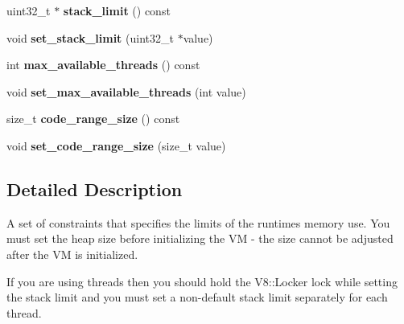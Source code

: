\begin{DoxyCompactItemize}
\item 
\hypertarget{classv8_1_1_resource_constraints_aafc4a94f2eeb0684e7a50f355eb4d06d}{}uint32\+\_\+t $\ast$ {\bfseries stack\+\_\+limit} () const \label{classv8_1_1_resource_constraints_aafc4a94f2eeb0684e7a50f355eb4d06d}

\item 
\hypertarget{classv8_1_1_resource_constraints_a26ed3e89985a4afe34e84509fb093cf1}{}void {\bfseries set\+\_\+stack\+\_\+limit} (uint32\+\_\+t $\ast$value)\label{classv8_1_1_resource_constraints_a26ed3e89985a4afe34e84509fb093cf1}

\item 
\hypertarget{classv8_1_1_resource_constraints_a27a36f0bacb800468d3574f738d12436}{}int {\bfseries max\+\_\+available\+\_\+threads} () const \label{classv8_1_1_resource_constraints_a27a36f0bacb800468d3574f738d12436}

\item 
\hypertarget{classv8_1_1_resource_constraints_a1bec2735c94ff50bfbd54bd70f004b72}{}void {\bfseries set\+\_\+max\+\_\+available\+\_\+threads} (int value)\label{classv8_1_1_resource_constraints_a1bec2735c94ff50bfbd54bd70f004b72}

\item 
\hypertarget{classv8_1_1_resource_constraints_a8dd511917ad17bf2185d574b0c7e4186}{}size\+\_\+t {\bfseries code\+\_\+range\+\_\+size} () const \label{classv8_1_1_resource_constraints_a8dd511917ad17bf2185d574b0c7e4186}

\item 
\hypertarget{classv8_1_1_resource_constraints_af887bf453b41b79eb174e5eeee0f1db2}{}void {\bfseries set\+\_\+code\+\_\+range\+\_\+size} (size\+\_\+t value)\label{classv8_1_1_resource_constraints_af887bf453b41b79eb174e5eeee0f1db2}

\end{DoxyCompactItemize}


\subsection{Detailed Description}
A set of constraints that specifies the limits of the runtime\textquotesingle{}s memory use. You must set the heap size before initializing the V\+M -\/ the size cannot be adjusted after the V\+M is initialized.

If you are using threads then you should hold the V8\+::\+Locker lock while setting the stack limit and you must set a non-\/default stack limit separately for each thread. 

